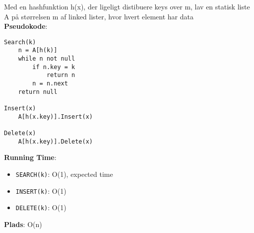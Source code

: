Med en hashfunktion h(x), der ligeligt distibuere keys over m, lav en statisk liste A på størrelsen m af linked lister, hvor hvert element har data\\
\textbf{Pseudokode}:
\begin{lstlisting}[frame=single, mathescape=true]
Search(k)
	n = A[h(k)]
	while n not null
		if n.key = k
			return n
		n = n.next
	return null

Insert(x)
	A[h(x.key)].Insert(x)

Delete(x)
	A[h(x.key)].Delete(x)
\end{lstlisting}
\textbf{Running Time}:
\begin{itemize}
	\item \texttt{SEARCH(k)}: O(1), expected time
	\item \texttt{INSERT(k)}: O(1)
	\item \texttt{DELETE(k)}: O(1)
\end{itemize}
\textbf{Plads}: O(n)